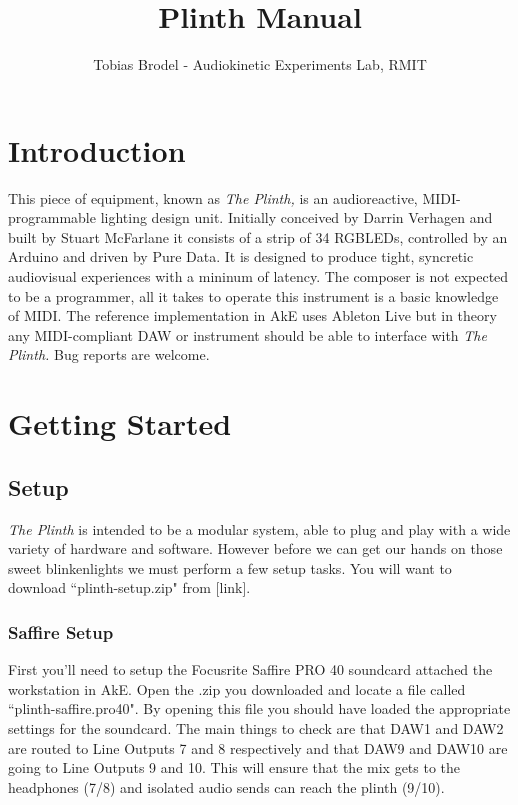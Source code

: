 \documentclass{article}
\title{Plinth Manual}
\author{Tobias Brodel - Audiokinetic Experiments Lab, RMIT}
\begin{document}
	\maketitle
	\newpage
	\tableofcontents
	\newpage

	\section{Introduction}
	This piece of equipment, known as \emph{The Plinth,} is an audioreactive, 
	MIDI-programmable lighting design unit. Initially conceived by Darrin 
	Verhagen and built by Stuart McFarlane it consists of a strip of 34 
	RGBLEDs, controlled by an Arduino and driven by Pure Data. It is 
	designed to produce tight, syncretic audiovisual experiences with a mininum 
	of latency. The composer is not expected to be a programmer, all it takes 
	to operate this instrument is a basic knowledge of MIDI. The reference 
	implementation in AkE uses Ableton Live but in theory any MIDI-compliant 
	DAW or instrument should be able to interface with \emph{The Plinth.} Bug 
	reports are welcome.

	\section{Getting Started}
	\subsection{Setup}
	\emph{The Plinth} is intended to be a modular system, able to plug and play 
	with a wide variety of hardware and software. However before we can get our 
	hands on those sweet blinkenlights we must perform a few setup tasks. You 
	will want to download ``plinth-setup.zip" from [link].

	\subsubsection{Saffire Setup}
	First you'll need to setup the Focusrite Saffire PRO 40 soundcard attached 
	the workstation in AkE. Open the .zip you downloaded and locate a file 
	called ``plinth-saffire.pro40". By opening this file you should have loaded 
	the appropriate settings for the soundcard. The main things to check are 
	that DAW1 and DAW2 are routed to Line Outputs 7 and 8 respectively and that 
	DAW9 and DAW10 are going to Line Outputs 9 and 10. This will ensure that 
	the mix gets to the headphones (7/8) and isolated audio sends can reach the 
	plinth (9/10).
\end{document}
